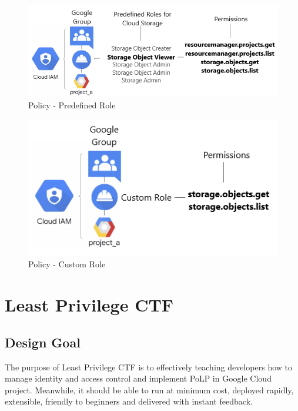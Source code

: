\documentclass[sigconf]{acmart}
\begin{document}
\begin{figure}[h]
  \centering
  \includegraphics[width=\linewidth]{sto-pre}
  \caption {Policy - Predefined Role}
   \label{fig:sto-pre}
\end{figure}

\begin{figure}[h]
  \centering
  \includegraphics[width=\linewidth]{sto-cus}
  \caption {Policy - Custom Role}
   \label{fig:sto-cus}
\end{figure}




\section{Least Privilege CTF}

\subsection{Design Goal}
The purpose of Least Privilege CTF is to effectively teaching developers how to manage identity and access control and implement PoLP in Google Cloud project. Meanwhile, it should be able to run at minimum cost, deployed rapidly, extensible, friendly to beginners and delivered with instant feedback.
\end{document}
